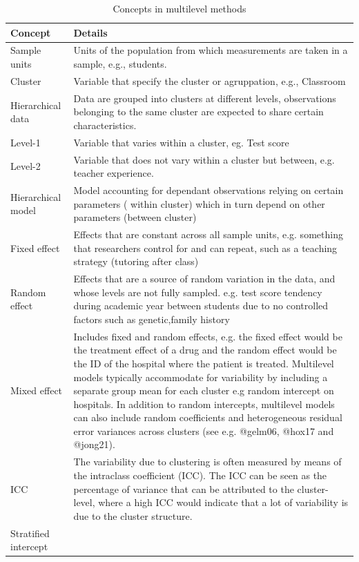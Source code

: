 \documentclass[
]{jss}
\begin{document}
\begin{CodeChunk}
\begin{table}

\caption{\label{tab:clus0}Concepts in multilevel methods}
\centering
\begin{tabular}[t]{>{\raggedright\arraybackslash}p{3cm}>{\raggedright\arraybackslash}p{12cm}}
\toprule
Concept & Details\\
\midrule
Sample units & Units of the population from which measurements are taken in a sample, e.g., students.\\
Cluster & Variable that specify the cluster or agruppation, e.g., Classroom\\
Hierarchical data & Data are grouped into clusters at different levels, observations belonging to the same cluster are expected to share certain characteristics.\\
Level-1 & Variable that varies within a cluster, eg. Test score\\
Level-2 & Variable that does not vary within a cluster but between, e.g. teacher experience.\\
\addlinespace
Hierarchical model & Model accounting for dependant observations relying on certain parameters ( within cluster) which in turn depend on other parameters (between cluster)\\
Fixed effect & Effects that are constant across all sample units, e.g. something that researchers control for and can repeat, such as  a teaching strategy (tutoring after class)\\
Random effect & Effects that are a source of random variation in the data, and whose levels are not fully sampled. e.g. test score tendency during academic year between students due to no controlled factors such as  genetic,family history\\
Mixed effect & Includes fixed and random effects, e.g. the fixed effect would be the treatment effect of a drug and the random effect would be the ID of the hospital where the patient is treated. Multilevel models typically accommodate for variability by including a separate group mean for each cluster e.g random intercept on hospitals. In addition to random intercepts, multilevel models can also include random coefficients and heterogeneous residual error variances across clusters (see e.g. @gelm06, @hox17 and @jong21).\\
ICC & The variability due to clustering is often measured by means of the intraclass coefficient (ICC). The ICC can be seen as the percentage
of variance that can be attributed to the cluster-level, where a high ICC would indicate that a lot of variability is due to the cluster structure.\\
\addlinespace
Stratified intercept & \\
\bottomrule
\end{tabular}
\end{table}

\end{CodeChunk}
\end{document}
